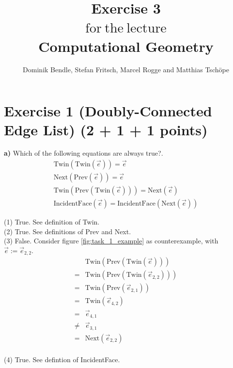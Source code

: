 \documentclass[english, fontsize=12pt, paper=a4, twoside=false, draft=true, pagesize=auto, version=last, DIV=16]{scrartcl}
\theoremstyle{break}
\begin{document}
\title{
\vspace*{-10mm}
Exercise 3 \\[-3pt]
{\Large $\mathrm{for \ the \ lecture}$} \\[-3pt]
{\LARGE \textbf{Computational Geometry}}
}
\author{Dominik Bendle, Stefan Fritsch, Marcel Rogge and Matthias Tschöpe}
\maketitle
\vspace*{-10mm}

\section*{Exercise 1 (Doubly-Connected Edge List) {\large \hfill (2 + 1 + 1 points)}}
\textbf{a)} Which of the following equations are always true?. 
\begin{align}
\text{Twin}(\text{Twin}(\vec{e})) = \vec{e} \\
\text{Next}(\text{Prev}(\vec{e})) = \vec{e} \\
\text{Twin}(\text{Prev}(\text{Twin}(\vec{e}))) = \text{Next}(\vec{e}) \\
\text{IncidentFace}(\vec{e}) = \text{IncidentFace}(\text{Next}(\vec{e}))
\end{align} \par
\medskip
(1) True. See definition of Twin. \\
(2) True. See definitions of Prev and Next. \\
(3) False. Consider figure \ref{fig:task_1_example} as counterexample, with $\vec{e} := \vec{e}_{2,2}.$
\begin{align*}
&\text{Twin}(\text{Prev}(\text{Twin}(\vec{e}))) \\
= &\text{Twin}(\text{Prev}(\text{Twin}(\vec{e}_{2,2})))\\
= &\text{Twin}(\text{Prev}(\vec{e}_{2,1})) \\
= &\text{Twin}(\vec{e}_{4,2}) \\
= & \vec{e}_{4,1}\\
\neq & \vec{e}_{3,1}\\
= &\text{Next}(\vec{e}_{2,2}) \\
\end{align*}

(4) True. See defintion of IncidentFace. \\
\end{document}
